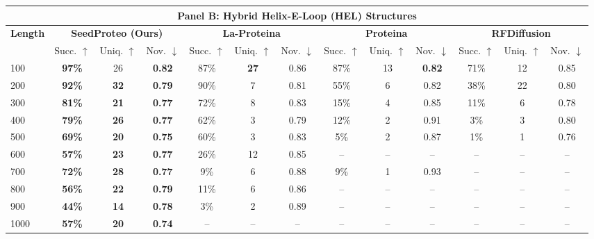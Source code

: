 \documentclass[]{bytedance_seed}
\begin{document}
\begin{table}[p]
{\begin{tabular}{l | ccc | ccc | ccc | ccc}
        \midrule
        \multicolumn{13}{c}{\large \textbf{Panel B: Hybrid Helix-E-Loop (HEL) Structures}} \\
        \midrule
        \multirow{2}{*}{\textbf{Length}} & \multicolumn{3}{c|}{\textbf{SeedProteo (Ours)}} & \multicolumn{3}{c|}{\textbf{La-Proteina}} & \multicolumn{3}{c|}{\textbf{Proteina}} & \multicolumn{3}{c}{\textbf{RFDiffusion}} \\
        \cmidrule(lr){2-4} \cmidrule(lr){5-7} \cmidrule(lr){8-10} \cmidrule(lr){11-13}
         & Succ. $\uparrow$ & Uniq. $\uparrow$ & Nov. $\downarrow$ & Succ. $\uparrow$ & Uniq. $\uparrow$ & Nov. $\downarrow$ & Succ. $\uparrow$ & Uniq. $\uparrow$ & Nov. $\downarrow$ & Succ. $\uparrow$ & Uniq. $\uparrow$ & Nov. $\downarrow$ \\
        \midrule
        100 & \textbf{97\%} & 26 & \textbf{0.82} & 87\% & \textbf{27} & 0.86 & 87\% & 13 & \textbf{0.82} & 71\% & 12 & 0.85 \\
        200 & \textbf{92\%} & \textbf{32} & \textbf{0.79} & 90\% & 7 & 0.81 & 55\% & 6 & 0.82 & 38\% & 22 & 0.80 \\
        300 & \textbf{81\%} & \textbf{21} & \textbf{0.77} & 72\% & 8 & 0.83 & 15\% & 4 & 0.85 & 11\% & 6 & 0.78 \\
        400 & \textbf{79\%} & \textbf{26} & \textbf{0.77} & 62\% & 3 & 0.79 & 12\% & 2 & 0.91 & 3\% & 3 & 0.80 \\
        500 & \textbf{69\%} & \textbf{20} & \textbf{0.75} & 60\% & 3 & 0.83 & 5\% & 2 & 0.87 & 1\% & 1 & 0.76 \\
        600 & \textbf{57\%} & \textbf{23} & \textbf{0.77} & 26\% & 12 & 0.85 & -- & -- & -- & -- & -- & -- \\
        700 & \textbf{72\%} & \textbf{28} & \textbf{0.77} & 9\% & 6 & 0.88 & 9\% & 1 & 0.93 & -- & -- & -- \\
        800 & \textbf{56\%} & \textbf{22} & \textbf{0.79} & 11\% & 6 & 0.86 & -- & -- & -- & -- & -- & -- \\
        900 & \textbf{44\%} & \textbf{14} & \textbf{0.78} & 3\% & 2 & 0.89 & -- & -- & -- & -- & -- & -- \\
        1000 & \textbf{57\%} & \textbf{20} & \textbf{0.74} & -- & -- & -- & -- & -- & -- & -- & -- & -- \\
        

\end{tabular}}
\end{table}
\end{document}
